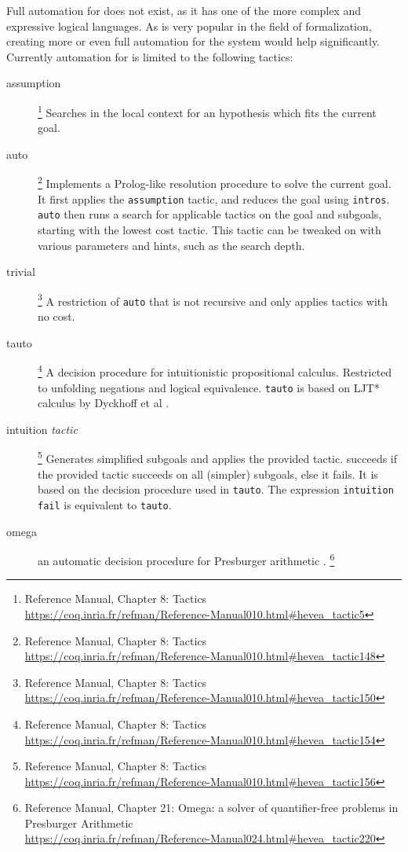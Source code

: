 Full automation for \coq does not exist, as it has one of the more complex and expressive logical languages.
As \coq is very popular in the field of formalization, creating more or even full automation for the system would help significantly.
Currently automation for \coq is limited to the following tactics:
\begin{description}
\item[assumption]
  \footnote{
    \coq Reference Manual, Chapter 8:
    Tactics\\
    \url{https://coq.inria.fr/refman/Reference-Manual010.html\#hevea_tactic5}
  }
  Searches in the local context for an hypothesis which fits the current goal.
\item[auto]
  \footnote{
    \coq Reference Manual, Chapter 8:
    Tactics\\
    \url{https://coq.inria.fr/refman/Reference-Manual010.html\#hevea_tactic148}
  }
  Implements a Prolog-like resolution procedure to solve the current goal.
  It first applies the \texttt{assumption} tactic, and reduces the goal using \texttt{intros}.
  \texttt{auto} then runs a search for applicable tactics on the goal and subgoals, starting with the lowest cost tactic.
  This tactic can be tweaked on with various parameters and hints, such as the search depth.
\item[trivial]
  \footnote{
    \coq Reference Manual, Chapter 8:
    Tactics\\
    \url{https://coq.inria.fr/refman/Reference-Manual010.html\#hevea_tactic150}
  }
  A restriction of \texttt{auto} that is not recursive and only applies tactics with no cost.
\item[tauto]
  \footnote{
    \coq Reference Manual, Chapter 8:
    Tactics\\
    \url{https://coq.inria.fr/refman/Reference-Manual010.html\#hevea_tactic154}
  }
  A decision procedure for intuitionistic propositional calculus.
  Restricted to unfolding negations and logical equivalence.
  \texttt{tauto} is based on LJT* calculus by Dyckhoff et al \cite{dyckhoff1992contraction}.
\item[intuition \emph{tactic}]
  \footnote{
    \coq Reference Manual, Chapter 8:
    Tactics\\
    \url{https://coq.inria.fr/refman/Reference-Manual010.html\#hevea_tactic156}
  }
  Generates simplified subgoals and applies the provided tactic.
   succeeds if the provided tactic succeeds on all (simpler) subgoals, else it fails.
  It is based on the decision procedure used in \texttt{tauto}.
  The expression \texttt{intuition fail} is equivalent to \texttt{tauto}.
\item[omega]
  an automatic decision procedure for Presburger arithmetic \cite{stansifer1984presburger}.%
  \footnote{
    \coq Reference Manual, Chapter 21:
    Omega: a solver of quantifier-free problems in Presburger Arithmetic\\
    \url{https://coq.inria.fr/refman/Reference-Manual024.html\#hevea_tactic220}
  }
\end{description}

